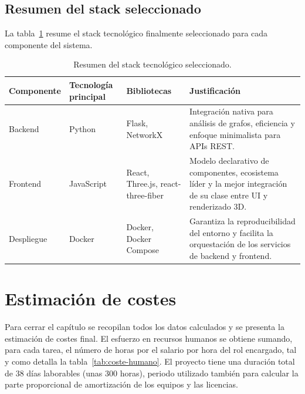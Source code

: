 \subsection{Resumen del stack seleccionado}

La tabla~\ref{tab:stack} resume el stack tecnológico finalmente seleccionado para cada componente del
sistema.

\begin{table}[H]
	\centering
	\caption{Resumen del stack tecnológico seleccionado.}
	\label{tab:stack}
	\small
	\begin{tabularx}{\textwidth}{>{\raggedright\arraybackslash}p{2.2cm} >{\raggedright\arraybackslash}p{2.3cm} >{\raggedright\arraybackslash}p{2.9cm} >{\raggedright\arraybackslash}X}
		\toprule
		\textbf{Componente} & \textbf{Tecnología principal} & \textbf{Bibliotecas} & \textbf{Justificación} \\
		\midrule
		Backend & Python & Flask, NetworkX &
			Integración nativa para análisis de grafos, eficiencia y enfoque minimalista para APIs REST. \\
		\addlinespace
		Frontend & JavaScript & React, Three.js, react-three-fiber &
			Modelo declarativo de componentes, ecosistema líder y la mejor integración de su clase entre
			UI y renderizado 3D. \\
		\addlinespace
		Despliegue & Docker & Docker, Docker Compose &
			Garantiza la reproducibilidad del entorno y facilita la orquestación de los servicios de
			backend y frontend. \\
		\bottomrule
	\end{tabularx}
\end{table}

\section{Estimación de costes}

Para cerrar el capítulo se recopilan todos los datos calculados y se presenta la estimación de costes
final. El esfuerzo en recursos humanos se obtiene sumando, para cada tarea, el número de horas por el
salario por hora del rol encargado, tal y como detalla la tabla~\ref{tab:coste-humano}. El proyecto
tiene una duración total de 38 días laborables (unas 300 horas), periodo utilizado también para
calcular la parte proporcional de amortización de los equipos y las licencias.

